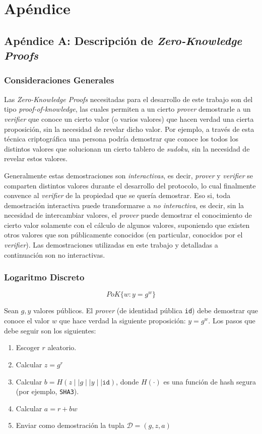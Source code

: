 \chapter{Apéndice}

\section{Apéndice A: Descripción de \emph{Zero-Knowledge Proofs}}\label{apen-a}

\subsection{Consideraciones Generales}

Las \emph{Zero-Knowledge Proofs} necesitadas para el desarrollo de este trabajo son del tipo \emph{proof-of-knowledge}, las cuales permiten a un cierto \emph{prover} demostrarle a un \emph{verifier} que conoce un cierto valor (o varios valores) que hacen verdad una cierta proposición, sin la necesidad de revelar dicho valor. Por ejemplo, a través de esta técnica criptográfica una persona podría demostrar que conoce los todos los distintos valores que solucionan un cierto tablero de \emph{sudoku}, sin la necesidad de revelar estos valores.

Generalmente estas demostraciones son \emph{interactivas}, es decir, 
\emph{prover} y \emph{verifier} se comparten distintos valores durante el desarrollo del protocolo, lo cual finalmente convence al \emph{verifier} de la propiedad que se quería demostrar. Eso si, toda demostración interactiva puede transformarse a \emph{no interactiva}, es decir, sin la necesidad de intercambiar valores, el \emph{prover} puede demostrar el conocimiento de cierto valor solamente con el cálculo de algunos valores, suponiendo que existen otros valores que son públicamente conocidos (en particular, conocidos por el \emph{verifier}). Las demostraciones utilizadas en este trabajo y detalladas a continuación son no interactivas.

\subsection{Logaritmo Discreto}

$$PoK\{w: y = g^w\}$$

Sean $g, y$ valores públicos. El \emph{prover} (de identidad pública 
\texttt{id}) debe demostrar que conoce el valor $w$ que hace verdad la 
siguiente proposición: $y = g^w$. Los pasos que debe seguir son los siguientes:
\begin{enumerate}
	\item Escoger $r$ aleatorio.
	\item Calcular $z = g^r$
	\item Calcular $b = H(z \mid\mid g \mid\mid y \mid\mid \mathtt{id})$, 
	donde $H(\cdot)$ es una función de hash segura (por ejemplo, 
	\texttt{SHA3}).
	\item Calcular $a = r + bw$
	\item Enviar como demostración la tupla $\mathcal{D} = (g, z, a)$
\end{enumerate}


